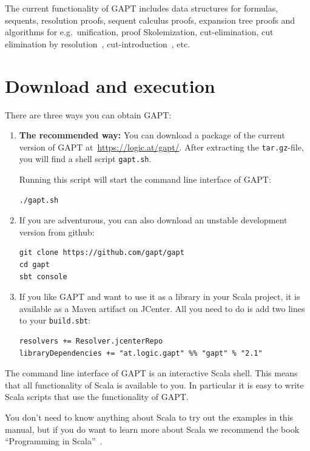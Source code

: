 \documentclass[a4paper,11pt]{article}
\begin{document}
The current functionality of GAPT includes data structures for formulas,
sequents, resolution proofs, sequent calculus proofs, expansion tree proofs and
algorithms for e.g.\ unification, proof Skolemization, cut-elimination, cut
elimination by resolution~\cite{Baaz00CutElimination},
cut-introduction~\cite{Hetzl2012}, etc.

\section{Download and execution}

There are three ways you can obtain GAPT:

\begin{enumerate}

\item {\bfseries The recommended way:}  You can download a package of the current
version of GAPT at~\url{https://logic.at/gapt/}.  After extracting
the \texttt{tar.gz}-file, you will find a shell script \texttt{gapt.sh}.

Running this script will start the command line interface of GAPT:
\begin{lstlisting}
./gapt.sh
\end{lstlisting}

\item If you are adventurous, you can also download an unstable development
  version from github:
\begin{lstlisting}
git clone https://github.com/gapt/gapt
cd gapt
sbt console
\end{lstlisting}

\item If you like GAPT and want to use it as a library in your Scala project,
  it is available as a Maven artifact on JCenter.  All you need to do is add
  two lines to your \verb,build.sbt,:
\begin{lstlisting}
resolvers += Resolver.jcenterRepo
libraryDependencies += "at.logic.gapt" %% "gapt" % "2.1"
\end{lstlisting}

\end{enumerate}

The command line interface of GAPT is an interactive Scala shell.  This means
that all functionality of Scala is available to you.  In particular it is easy
to write Scala scripts that use the functionality of GAPT.

You don't need to know anything about Scala to try out the examples in this
manual, but if you do want to learn more about Scala we recommend the book
``Programming in Scala''~\cite{odersky2008programming}.
\end{document}

